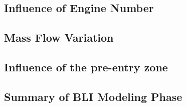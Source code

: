 \subsection{Influence of Engine Number}

\subsection{Mass Flow Variation}

\subsection{Influence of the pre-entry zone}

\subsection{Summary of BLI Modeling Phase}